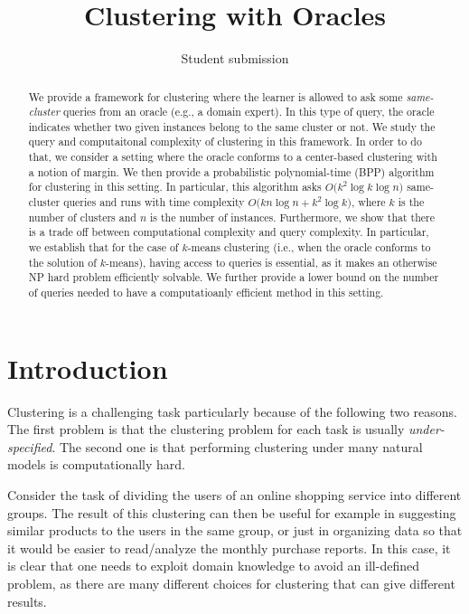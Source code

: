 \documentclass[orivec]{llncs}
\title{Clustering with Oracles}
\author{Student submission}
\begin{document}
\maketitle

\begin{abstract}
We provide a framework for clustering where the learner is allowed to ask some \emph{same-cluster} queries from an oracle (e.g., a domain expert). In this type of query, the oracle indicates whether two given instances belong to the same cluster or not. We study the query and computaitonal complexity of clustering in this framework. In order to do that, we consider a setting where the oracle conforms to a center-based clustering with a notion of margin. We then provide a probabilistic polynomial-time (BPP) algorithm  for clustering in this setting. In particular, this algorithm asks $O\big(k^2\log k\log n)$ same-cluster queries and runs with time complexity $O\big(kn\log n + k^2\log k)$, where $k$ is the number of clusters and $n$ is the number of instances.  Furthermore, we show that there is a trade off between computational complexity and query complexity. In particular, we establish that for the case of $k$-means clustering (i.e., when the oracle conforms to the solution of $k$-means), having access to queries is essential, as it makes an otherwise NP hard problem efficiently solvable. We further provide a lower bound on the number of queries needed to have a computatioanly efficient method in this setting.


\end{abstract}

\section{Introduction}

Clustering is a challenging task particularly because of the following two reasons. The first problem is that the clustering problem for each task is usually \emph{under-specified}. The second one is that performing clustering under many natural models is computationally hard.

Consider the task of dividing the users of an online shopping service into different groups. The result of this clustering can then be useful for example in suggesting similar products to the users in the same group, or just in organizing data so that it would be easier to read/analyze the monthly purchase reports. In this case, it is clear that one needs to exploit domain knowledge to avoid an ill-defined problem, as there are many different choices for clustering that can give different results. 
\end{document}
